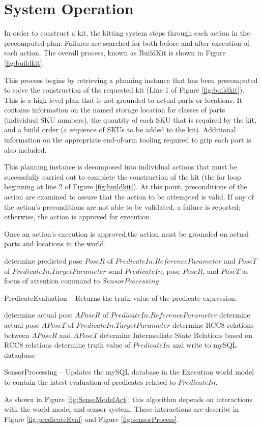 \documentclass{llncs}
\begin{document}
\section{System Operation}
\label{sect:operation}
In order to construct a kit, the kitting system steps through each action in
the precomputed plan. Failures are searched for both before and after execution of 
each action. The overall process, known as {\sc BuildKit} is shown in Figure
\ref{fig:buildkit}. 

This process begins by retrieving a planning instance that has been 
precomputed to solve the construction of the requested kit (Line 1 of 
Figure \ref{fig:buildkit}). This is a high-level
plan that is not grounded to actual parts or locations. It contains information
on the named storage location for classes of parts (individual SKU numbers), 
the quantity of each SKU that is required by the kit, and a build order (a sequence
of SKUs to be added to the kit). Additional information on the appropriate
end-of-arm tooling required to grip each part is also included.

This planning instance is decomposed into individual actions that must
be successfully carried out to complete the construction of the kit (the
for loop beginning at line 2 of Figure \ref{fig:buildkit}). At this point,
preconditions of the action are examined to assure that the action to be attempted
is valid. If any of the action's preconditions are not able to be validated,
a failure is reported; otherwise, the action is approved for execution.

Once an action's execution is approved,the action must be grounded on actual
parts and locations in the world. 

%
\begin{algorithm}[h!]
 	determine predicted pose $PoseR$ of $PredicateIn.ReferenceParameter$
 	and $PoseT$ of $PredicateIn.TargetParameter$ \;
 	send $PredicateIn$, pose $PoseR$, and $PoseT$ as focus of attention command to $SensorProcessing$\;
\caption{{\sc PredicateEvaluation} -- Returns the truth value of the predicate expression.}
\label{fig:predicateEval}
\end{algorithm}
%
\begin{algorithm}[h!]
 	determine actual pose $APoseR$ of $PredicateIn.ReferenceParameter$\;
 	determine actual pose $APoseT$ of $PredicateIn.TargetParameter$\;
 	determine RCC8 relations between $APoseR$ and $APoseT$\;
 	determine Intermediate State Relations based on RCC8 relations\;
 	determine truth value of $PredicateIn$ and write to mySQL dataqbase\;
\caption{{\sc SensorProcessing} -- Updates the mySQL database in the Execution world model
to contain the latest evaluation of predicates related to $PredicateIn$.}
\label{fig:sensorProcess}
\end{algorithm}
% 
As shown in Figure \ref{fig:SenseModelAct}, this algorithm
depends on interactions with the world model and sensor system. These
interactions are describe in Figure \ref{fig:predicateEval} and Figure \ref{fig:sensorProcess}.
\end{document}
